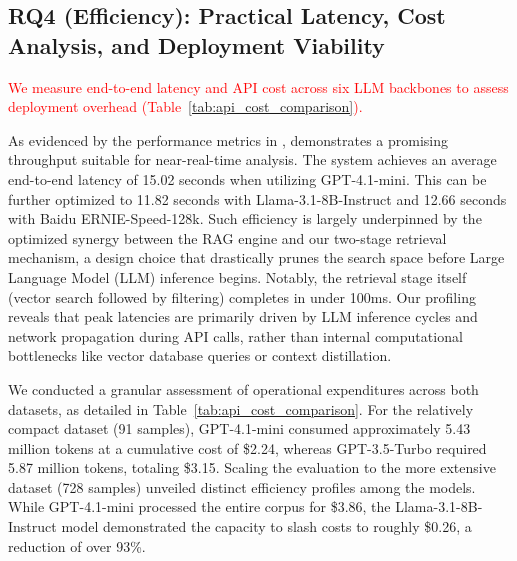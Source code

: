 \begin{tcolorbox}[colback=black!5!white,colframe=black!75!black,sharp corners,fontupper=\small,title=Answer to RQ3]
\end{tcolorbox}

\subsection{RQ4 (Efficiency): Practical Latency, Cost Analysis, and Deployment Viability}

\textcolor{red}{We measure end-to-end latency and API cost across six LLM backbones to assess deployment overhead (Table~\ref{tab:api_cost_comparison}).}



As evidenced by the performance metrics in , \approach{} demonstrates a promising throughput suitable for near-real-time analysis. The system achieves an average end-to-end latency of 15.02 seconds when utilizing GPT-4.1-mini. This can be further optimized to 11.82 seconds with Llama-3.1-8B-Instruct and 12.66 seconds with Baidu ERNIE-Speed-128k. Such efficiency is largely underpinned by the optimized synergy between the RAG engine and our two-stage retrieval mechanism, a design choice that drastically prunes the search space before Large Language Model (LLM) inference begins. Notably, the retrieval stage itself (vector search followed by filtering) completes in under 100ms. Our profiling reveals that peak latencies are primarily driven by LLM inference cycles and network propagation during API calls, rather than internal computational bottlenecks like vector database queries or context distillation.

We conducted a granular assessment of operational expenditures across both datasets, as detailed in Table~\ref{tab:api_cost_comparison}. For the relatively compact \done{} dataset (91 samples), GPT-4.1-mini consumed approximately 5.43 million tokens at a cumulative cost of \$2.24, whereas GPT-3.5-Turbo required 5.87 million tokens, totaling \$3.15. Scaling the evaluation to the more extensive \dsystem{} dataset (728 samples) unveiled distinct efficiency profiles among the models. While GPT-4.1-mini processed the entire corpus for \$3.86, the Llama-3.1-8B-Instruct model demonstrated the capacity to slash costs to roughly \$0.26, a reduction of over 93\%.

